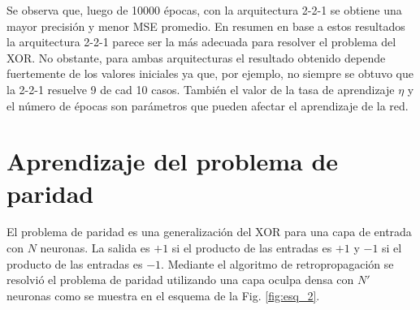 \documentclass[11pt,twocolumn,twoside]{opticajnl}
\begin{document}
Se observa que, luego de 10000 épocas, con la arquitectura 2-2-1 se obtiene una mayor precisión y menor MSE promedio. En resumen en base a estos resultados la arquitectura 2-2-1 parece ser la más adecuada para resolver el problema del XOR. No obstante, para ambas arquitecturas el resultado obtenido depende fuertemente de los valores iniciales ya que, por ejemplo, no siempre se obtuvo que la 2-2-1 resuelve 9 de cad 10 casos. También el valor de la tasa de aprendizaje $\eta$ y el número de épocas son parámetros que pueden afectar el aprendizaje de la red.


\section{Aprendizaje del problema de paridad \label{sec:ej2}}

\vspace{0.3cm}

El problema de paridad es una generalización del XOR para una capa de entrada con $N$ neuronas. La salida es $+1$ si el producto de las entradas es $+1$ y $-1$ si el producto de las entradas es $-1$. Mediante el algoritmo de retropropagación se resolvió el problema de paridad utilizando una capa oculpa densa con $N'$ neuronas como se muestra en el esquema de la Fig. \ref{fig:esq_2}. 
\end{document}
